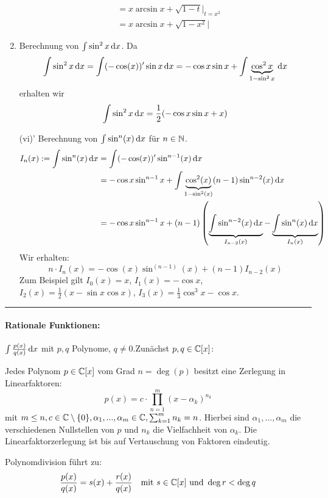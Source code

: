 \begin{example}
\begin{example}
\begin{enumerate}
\begin{equation*}
\begin{split}
		& = x\arcsin x + \sqrt{1-t}\big\vert_{t=x^2} \\
		& = x\arcsin x + \sqrt{1-x^2} \big\vert
	\end{split}
	\end{equation*}
	\item Berechnung von $\int \sin^2x \, \mathrm{d} x$. Da
	\begin{equation*}
		\int \sin^2 x \, \mathrm{d} x = \int (-\cos(x))' \sin x \, \mathrm{d} x = -\cos x \sin x + \int \underbrace{\cos^2 x}_{1-\sin^2 x} \, \mathrm{d} x
	\end{equation*}
	erhalten wir
	$$
	\int \sin^2 x \, \mathrm{d} x = \frac{1}{2} (-\cos x \sin x + x )	
	$$
	\item[(vi)'] Berechnung von $\int \sin^n(x) \, \mathrm{d} x$ für $n \in \mathbb{N}$.
	\begin{equation*}
		\begin{split}
		I_n (x) := \int \sin^n (x) \, \mathrm{d} x & = \int (-\cos(x))' \sin^{n-1}(x)\, \mathrm{d} x \\
				& = -\cos x \sin^{n-1} x + \int 	\underbrace{\cos^2 (x)}_{1-\sin^2(x)} (n-1) \sin^{n-2} (x) \, \mathrm{d} x \\
				&  = -\cos x \sin^{n-1} x +(n-1) \left( \underbrace{\int \sin^{n-2} (x) \, \mathrm{d} x}_{I_{n-2}(x)} - \underbrace{\int \sin^n(x)\, \mathrm{d} x}_{I_n(x)} \right)
		\end{split}
	\end{equation*}
	Wir erhalten:
	$$n \cdot I_n(x) = -\cos (x)\sin^{(n-1)}(x) + (n-1) I_{n-2}(x)$$
	Zum Beispiel gilt $I_0(x)=x$, $I_1(x)=-\cos x $, $I_2(x)=\frac{1}{2}(x-\sin x\cos x)$, $I_3(x)=\frac{1}{3} \cos^3 x - \cos x$.
\end{enumerate}
\end{example}
\newline
\rule{\textwidth}{0.4pt}

\paragraph{Rationale Funktionen:} $\int \frac{p(x)}{q(x)} \, \mathrm{d} x$ mit $p,q$ Polynome, $q \neq 0$.Zunächst $p,q \in \mathbb{C}[x]$:
\begin{satz} \begin{mdframed} Jedes Polynom $p \in \mathbb{C}[x]$ vom Grad $n= \deg (p)$ besitzt eine Zerlegung in Linearfaktoren:
$$ p(x) = c \cdot \prod_{n=1}^m (x-\alpha_k)^{n_k}$$
mit $m \leq n, c \in \mathbb{C} \setminus \{0\}, \alpha_1,...,\alpha_m \in \mathbb{C}, \sum_{k=1}^m n_k = n$. Hierbei sind $\alpha_1,...,\alpha_m$ die verschiedenen Nullstellen von $p$ und $n_k$ die Vielfachheit von $\alpha_k$. Die Linearfaktorzerlegung ist bis auf Vertauschung von Faktoren eindeutig.
\end{mdframed}
Polynomdivision führt zu:
$$\frac{p(x)}{q(x)} = s(x) + \frac{r(x)}{q(x)} \quad \text{mit } s\in \mathbb{C} [x] \text{ und } \deg r < \deg q$$
\end{satz}


\end{example}
